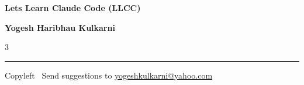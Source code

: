 \documentclass[8pt,landscape]{article}
\begin{document}
\footnotesize


\begin{center}
{\Large{\textbf{Lets Learn Claude Code (LLCC)}}}  

\textbf{Yogesh Haribhau Kulkarni}
\end{center}

\begin{multicols}{3}

\end{multicols}

\rule{\linewidth}{0.25pt}
\scriptsize
Copyleft \textcopyleft\  Send suggestions to 
\href{http://www.yogeshkulkarni.com}{yogeshkulkarni@yahoo.com}
\end{document}
